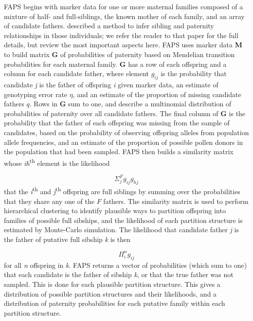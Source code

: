 \documentclass[10pt, a4paper, twocolumn]{article} %
\begin{document}
FAPS begins with marker data for one or more maternal families composed of a mixture of half- and full-siblings, the known mother of each family, and an array of candidate fathers.
\cite{ellis2018efficient} described a method to infer sibling and paternity relationships in those individuals; we refer the reader to that paper for the full details, but review the most important aspects here.
FAPS uses marker data \textbf{M} to build matrix \textbf{G} of probabilities of paternity based on Mendelian transition probabilities for each maternal family. \textbf{G} has a row of each offspring and a column for each candidate father, where element $g_{ij}$ is the probability that candidate \textit{j} is the father of offspring \textit{i} given marker data, an estimate of genotyping error rate $\eta$, and an estimate of the proportion of missing candidate fathers $q$. Rows in \textbf{G} sum to one, and describe a multinomial distribution of probabilities of paternity over all candidate fathers. The final column of \textbf{G} is the probability that the father of each offspring was missing from the sample of candidates, based on the probability of observing offspring alleles from population allele frequencies, and an estimate of the proportion of possible pollen donors in the population that had been sampled. FAPS then builds a similarity matrix whose \textit{ih}\textsuperscript{th} element is the likelihood 

\begin{equation}\label{eqn:faps_similarity_matrix}
\Sigma_j^F g_{ij}g_{hj}
\end{equation}
that the \textit{i}\textsuperscript{th} and \textit{j}\textsuperscript{th} offspring are full siblings by summing over the probabilities that they share any one of the $F$ fathers. The similarity matrix is used to perform hierarchical clustering to identify plausible ways to partition offspring into families of possible full sibships, and the likelihood of each partition structure is estimated by Monte-Carlo simulation. The likelihood that candidate father \textit{j} is the father of putative full sibship \textit{k} is then

\begin{equation}\label{eqn:faps_lik_sibship}
\Pi_i^n g_{ij}
\end{equation}
for all \textit{n} offspring in \textit{k}. FAPS returns a vector of probabilities (which sum to one) that each candidate is the father of sibship \textit{k}, or that the true father was not sampled. This is done for each plausible partition structure. This gives a distribution of possible partition structures and their likelihoods, and a distribution of paternity probabilities for each putative family within each partition structure.
\end{document}
